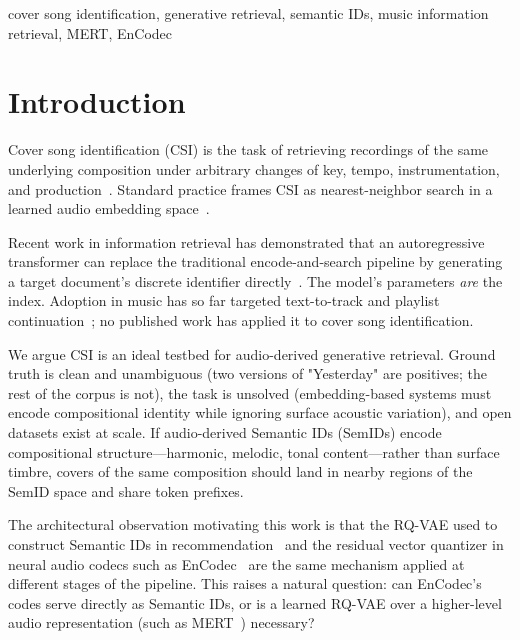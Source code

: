 \documentclass[conference]{IEEEtran}
\begin{document}
\begin{IEEEkeywords}
cover song identification, generative retrieval, semantic IDs, music information retrieval, MERT, EnCodec
\end{IEEEkeywords}

\section{Introduction}
Cover song identification (CSI) is the task of retrieving recordings of the same underlying composition under arbitrary changes of key, tempo, instrumentation, and production~\cite{ellis2007covers80, yesiler2019datacos, araz2024discogsvi}. Standard practice frames CSI as nearest-neighbor search in a learned audio embedding space~\cite{yesiler2019move, doh2021coverhunter}.

Recent work in information retrieval has demonstrated that an autoregressive transformer can replace the traditional encode-and-search pipeline by generating a target document's discrete identifier directly~\cite{tay2022dsi, rajput2023tiger}. The model's parameters \emph{are} the index. Adoption in music has so far targeted text-to-track and playlist continuation~\cite{palumbo2025text2tracks, kim2026fusid, mei2025semids}; no published work has applied it to cover song identification.

We argue CSI is an ideal testbed for audio-derived generative retrieval. Ground truth is clean and unambiguous (two versions of "Yesterday" are positives; the rest of the corpus is not), the task is unsolved (embedding-based systems must encode compositional identity while ignoring surface acoustic variation), and open datasets exist at scale. If audio-derived Semantic IDs (SemIDs) encode compositional structure---harmonic, melodic, tonal content---rather than surface timbre, covers of the same composition should land in nearby regions of the SemID space and share token prefixes.

The architectural observation motivating this work is that the RQ-VAE used to construct Semantic IDs in recommendation~\cite{rajput2023tiger} and the residual vector quantizer in neural audio codecs such as EnCodec~\cite{defossez2022encodec} are the same mechanism applied at different stages of the pipeline. This raises a natural question: can EnCodec's codes serve directly as Semantic IDs, or is a learned RQ-VAE over a higher-level audio representation (such as MERT~\cite{yuan2023mert}) necessary?
\end{document}

